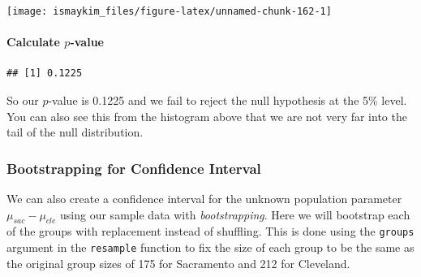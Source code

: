 \documentclass[]{tufte-book}
\newenvironment{Shaded}{\begin{snugshade}}{\end{snugshade}}
\newcommand{\KeywordTok}[1]{\textcolor[rgb]{0.13,0.29,0.53}{\textbf{{#1}}}}
\newcommand{\DataTypeTok}[1]{\textcolor[rgb]{0.13,0.29,0.53}{{#1}}}
\newcommand{\DecValTok}[1]{\textcolor[rgb]{0.00,0.00,0.81}{{#1}}}
\newcommand{\StringTok}[1]{\textcolor[rgb]{0.31,0.60,0.02}{{#1}}}
\newcommand{\OtherTok}[1]{\textcolor[rgb]{0.56,0.35,0.01}{{#1}}}
\newcommand{\NormalTok}[1]{{#1}}
\begin{document}
\begin{center}\texttt{[image: ismaykim\_files/figure-latex/unnamed-chunk-162-1]} \end{center}

\paragraph{\texorpdfstring{Calculate
\(p\)-value}{Calculate p-value}}\label{calculate-p-value-3}

\begin{Shaded}
\end{Shaded}

\begin{verbatim}
## [1] 0.1225
\end{verbatim}

So our \(p\)-value is 0.1225 and we fail to reject the null hypothesis
at the 5\% level. You can also see this from the histogram above that we
are not very far into the tail of the null distribution.

\subsubsection{Bootstrapping for Confidence
Interval}\label{bootstrapping-for-confidence-interval-3}

We can also create a confidence interval for the unknown population
parameter \(\mu_{sac} - \mu_{cle}\) using our sample data with
\emph{bootstrapping}. Here we will bootstrap each of the groups with
replacement instead of shuffling. This is done using the \texttt{groups}
argument in the \texttt{resample} function to fix the size of each group
to be the same as the original group sizes of 175 for Sacramento and 212
for Cleveland.

\begin{Shaded}
\end{Shaded}
\end{document}
